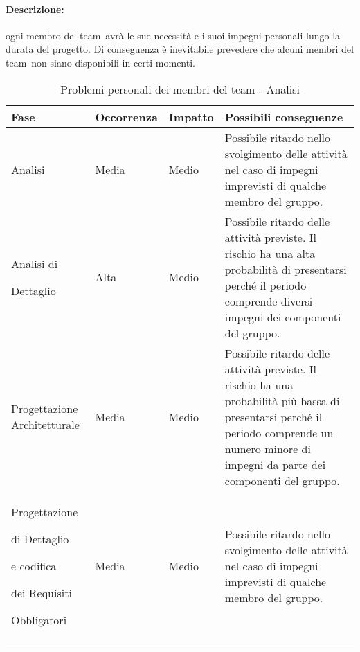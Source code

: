 \documentclass[../PianoProgetto.tex]{subfiles}
\begin{document}
	\paragraph*{Descrizione:} ogni membro del team\g\ avrà le sue necessità e i suoi impegni personali lungo la durata del progetto. Di conseguenza è inevitabile prevedere che alcuni membri del team\g\ non siano disponibili in certi momenti.
	 
	
	\hspace{0pt}
		\begin{longtabu} to \textwidth {X[.55] X[c .50] X[c .50] X}
			\toprule
			\textbf{Fase} & \textbf{Occorrenza} & \textbf{Impatto} & \textbf{Possibili conseguenze}\\
			\midrule
			Analisi & Media & Medio & Possibile ritardo nello svolgimento delle attività nel caso di impegni imprevisti di qualche membro del gruppo. \\
			\midrule
			Analisi di \par Dettaglio & Alta & Medio & Possibile ritardo delle attività previste. Il rischio ha una alta probabilità di presentarsi perché il periodo comprende diversi impegni dei componenti del gruppo.\\
			\midrule
			Progettazione Architetturale & Media & Medio & Possibile ritardo delle attività previste. Il rischio ha una probabilità più bassa di presentarsi perché il periodo comprende un numero minore di impegni da parte dei componenti del gruppo.\\
			\midrule
			Progettazione \par di Dettaglio \par e codifica \par dei Requisiti \par Obbligatori & Media & Medio & Possibile ritardo nello svolgimento delle attività nel caso di impegni imprevisti di qualche membro del gruppo.\\
			\bottomrule

		\caption{Problemi personali dei membri del team - Analisi}
		\label{tab:Problemi personali dei membri del team - Analisi}	
	\end{longtabu}
		
\end{document}
